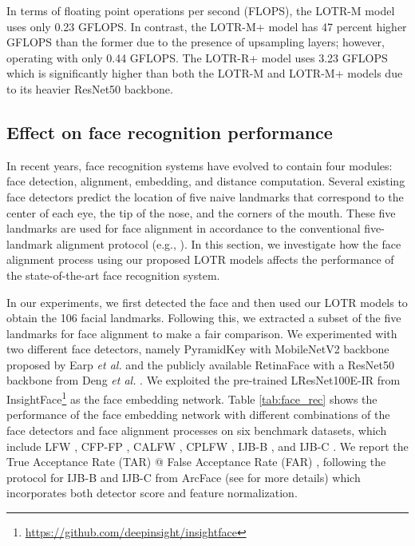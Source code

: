 \documentclass[journal]{IEEEtran}
\begin{document}
In terms of floating point operations per second  (FLOPS), the LOTR-M model uses only 0.23 GFLOPS. 
In contrast, the LOTR-M+ model has 47 percent higher GFLOPS than the former due to the presence of upsampling layers; however, operating with only 0.44 GFLOPS. 
The LOTR-R+ model uses 3.23 GFLOPS which is significantly higher than both the LOTR-M and LOTR-M+ models due to its heavier ResNet50 backbone.



\subsection{Effect on face recognition performance}\label{subsec:face_rec}
In recent years, face recognition systems have evolved to contain four modules: face detection, alignment, embedding, and distance computation.
Several existing face detectors predict the location of five naive landmarks that correspond to the center of each eye, the tip of the nose, and the corners of the mouth.
These five landmarks are used for face alignment in accordance to the conventional five-landmark alignment protocol (e.g., \cite{wolf2009,schroff2015,LiuWeiyang2017,wang2018,deng2018,an2020}).
In this section, we investigate how the face alignment process using our proposed LOTR models affects the performance of the state-of-the-art face recognition system.

In our experiments, we first detected the face and then used our LOTR models to obtain the 106 facial landmarks.
Following this, we extracted a subset of the five landmarks for face alignment to make a fair comparison.
We experimented with two different face detectors, namely PyramidKey with MobileNetV2 backbone proposed by Earp \textit{et al.} \cite{earp2019} and the publicly available RetinaFace with a ResNet50 backbone from Deng \textit{et al.} \cite{deng2019}.
We exploited the pre-trained LResNet100E-IR from InsightFace\footnote{\label{footnote:insightface}\href{https://github.com/deepinsight/insightface}{https://github.com/deepinsight/insightface}} as the face embedding network.
Table \ref{tab:face_rec} shows the performance of the face embedding network with different combinations of the face detectors and face alignment processes on six benchmark datasets, which include LFW  \cite{lfw}, CFP-FP \cite{cfp-fp}, CALFW \cite{calfw}, CPLFW \cite{cplfw}, IJB-B \cite{ijbb}, and IJB-C \cite{ijbc}.
We report the True Acceptance Rate (TAR) @ False Acceptance Rate (FAR) , following the protocol for IJB-B and IJB-C from ArcFace (see \cite{deng2018,an2020} for more details)
which incorporates both detector score and feature normalization.
\end{document}
